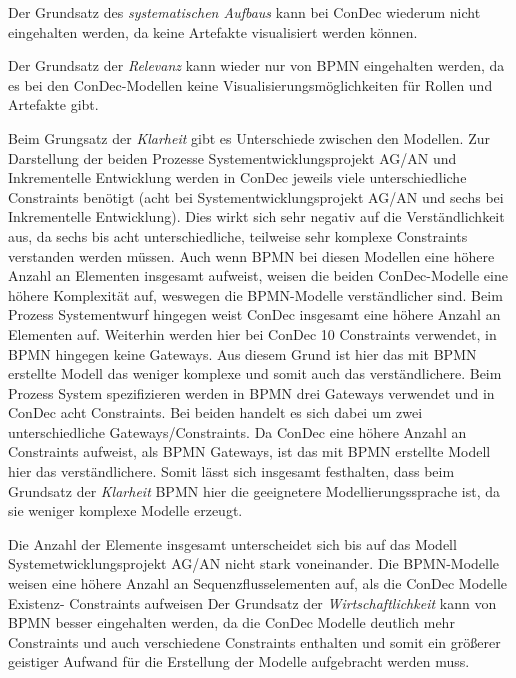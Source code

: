  
Der  Grundsatz des \textit{systematischen Aufbaus} kann bei ConDec wiederum nicht eingehalten werden, da keine Artefakte visualisiert werden können.\newline

Der Grundsatz der \textit{Relevanz} kann wieder nur von BPMN eingehalten werden, da es bei den ConDec-Modellen keine Visualisierungsmöglichkeiten für Rollen und Artefakte gibt.\newline


Beim Grungsatz der \textit{Klarheit} gibt es Unterschiede zwischen den Modellen. Zur Darstellung der beiden Prozesse Systementwicklungsprojekt AG/AN und Inkrementelle Entwicklung werden in ConDec jeweils viele unterschiedliche Constraints benötigt (acht bei Systementwicklungsprojekt AG/AN und sechs bei Inkrementelle Entwicklung). Dies wirkt sich sehr negativ auf die Verständlichkeit aus, da sechs bis acht unterschiedliche, teilweise sehr komplexe Constraints verstanden werden müssen. Auch wenn BPMN bei diesen Modellen eine höhere Anzahl an Elementen insgesamt aufweist, weisen die beiden ConDec-Modelle eine höhere Komplexität auf, weswegen die BPMN-Modelle verständlicher sind. \newline
Beim Prozess Systementwurf hingegen weist ConDec  insgesamt eine höhere Anzahl an Elementen auf. Weiterhin werden hier bei ConDec 10 Constraints verwendet, in BPMN hingegen keine Gateways. Aus diesem Grund ist hier das mit BPMN erstellte Modell das weniger komplexe und somit auch das verständlichere.\newline
Beim Prozess System spezifizieren werden in BPMN drei Gateways verwendet und in ConDec acht Constraints. Bei beiden handelt es sich dabei um zwei unterschiedliche Gateways/Constraints. Da ConDec eine höhere Anzahl an Constraints aufweist, als BPMN Gateways, ist das mit BPMN erstellte Modell hier das verständlichere. \newline
Somit lässt sich insgesamt festhalten, dass beim Grundsatz der \textit{Klarheit} BPMN hier die geeignetere Modellierungssprache ist, da sie weniger komplexe Modelle erzeugt.\newline

Die Anzahl der Elemente insgesamt unterscheidet sich bis auf das Modell Systemetwicklungsprojekt AG/AN nicht stark voneinander. Die BPMN-Modelle weisen eine höhere Anzahl an Sequenzflusselementen auf, als die ConDec Modelle Existenz- Constraints aufweisen
Der Grundsatz der \textit{Wirtschaftlichkeit} kann von BPMN besser eingehalten werden, da die ConDec Modelle deutlich mehr Constraints und auch verschiedene Constraints enthalten und somit ein größerer geistiger Aufwand für die Erstellung der Modelle aufgebracht werden muss.\newline


